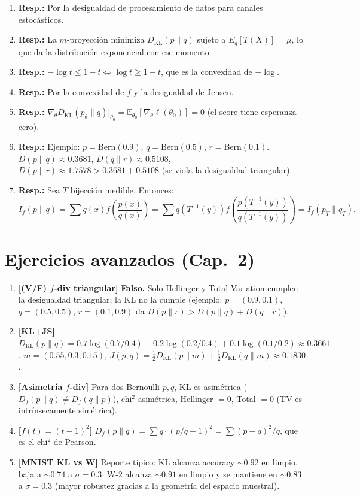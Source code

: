 \begin{enumerate}
	\item \textbf{Resp.:} Por la desigualdad de procesamiento de datos para canales estocásticos.
	\item \textbf{Resp.:} La $m$-proyección minimiza $D_{\mathrm{KL}}(p \| q)$ sujeto a $E_q[T(X)] = \mu$, lo que da la distribución exponencial con ese momento.
	\item \textbf{Resp.:} $-\log t \le 1 - t \iff \log t \ge 1 - t$, que es la convexidad de $-\log$.
	\item \textbf{Resp.:} Por la convexidad de $f$ y la desigualdad de Jensen.
	\item \textbf{Resp.:} $\nabla_\theta D_{\mathrm{KL}}(p_\theta \| q)\big|_{\theta_0} = \mathbb{E}_{\theta_0}[\nabla_\theta \ell(\theta_0)] = 0$ (el score tiene esperanza cero).
	\item \textbf{Resp.:} Ejemplo: $p = \mathrm{Bern}(0.9)$, $q = \mathrm{Bern}(0.5)$, $r = \mathrm{Bern}(0.1)$.  $D(p \| q) \approx 0.3681$, $D(q \| r) \approx 0.5108$, $D(p \| r) \approx 1.7578 > 0.3681 + 0.5108$ (se viola la desigualdad triangular).
	\item \textbf{Resp.:} Sea $T$ bijección medible.  Entonces:
	\[
	I_f(p \| q) = \sum q(x) f\!\left(\frac{p(x)}{q(x)}\right) = \sum q(T^{-1}(y)) f\!\left(\frac{p(T^{-1}(y))}{q(T^{-1}(y))}\right) = I_f(p_T \| q_T).
	\]
\end{enumerate}

\section*{Ejercicios avanzados (Cap.~2)}
\begin{enumerate}
	\item \textbf{[(V/F) $f$-div triangular]} \textbf{Falso.} Solo Hellinger y Total Variation cumplen la desigualdad triangular; la KL no la cumple (ejemplo: $p=(0.9,0.1)$, $q=(0.5,0.5)$, $r=(0.1,0.9)$ da $D(p\|r)>D(p\|q)+D(q\|r)$).
	\item \textbf{[KL+JS]} $D_{\mathrm{KL}}(p\|q)=0.7\log(0.7/0.4)+0.2\log(0.2/0.4)+0.1\log(0.1/0.2)\approx 0.3661$. $m=(0.55,0.3,0.15)$, $J(p,q)=\tfrac{1}{2}D_{\mathrm{KL}}(p\|m)+\tfrac{1}{2}D_{\mathrm{KL}}(q\|m)\approx 0.1830$.
	\item \textbf{[Asimetr\'ia $f$-div]} Para dos Bernoulli $p,q$, $\mathrm{KL}$ es asim\'etrica ($D_f(p\|q)\ne D_f(q\|p)$), chi$^2$ asim\'etrica, Hellinger $=0$, Total $=0$ (TV es intr\'insecamente sim\'etrica).
	\item \textbf{[$f(t)=(t-1)^2$]} $D_f(p\|q)=\sum q\cdot(p/q-1)^2=\sum(p-q)^2/q$, que es el chi$^2$ de Pearson.
	\item \textbf{[MNIST KL vs W]} Reporte t\'ipico: KL alcanza accuracy $\sim 0.92$ en limpio, baja a $\sim 0.74$ a $\sigma=0.3$; W-2 alcanza $\sim 0.91$ en limpio y se mantiene en $\sim 0.83$ a $\sigma=0.3$ (mayor robustez gracias a la geometr\'ia del espacio muestral).
\end{enumerate}

